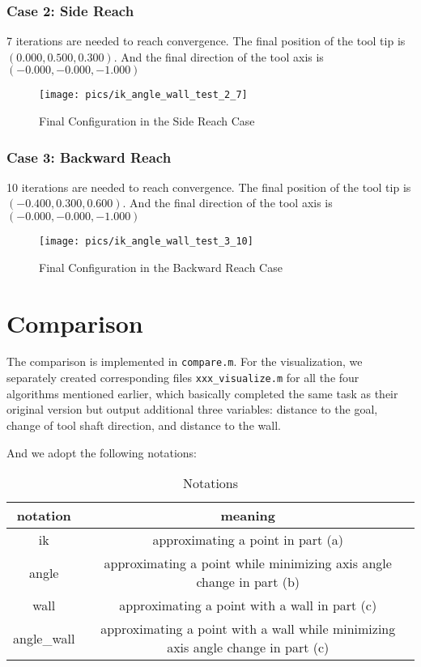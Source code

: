 \documentclass[english,10pt,a4paper]{book}
\begin{document}
		\subsubsection{Case 2: Side Reach}
		7 iterations are needed to reach convergence.
		The final position of the tool tip is \((0.000, 0.500, 0.300)\). And the final direction of the tool axis is \((-0.000, -0.000, -1.000)\)
		\begin{figure}[H]
			\centering
			\texttt{[image: pics/ik\_angle\_wall\_test\_2\_7]}
			\caption{Final Configuration in the Side Reach Case}
		\end{figure}
		\subsubsection{Case 3: Backward Reach}
		10 iterations are needed to reach convergence.
		The final position of the tool tip is \((-0.400, 0.300, 0.600)\). And the final direction of the tool axis is \((-0.000, -0.000, -1.000)\)
		\begin{figure}[H]
			\centering
			\texttt{[image: pics/ik\_angle\_wall\_test\_3\_10]}
			\caption{Final Configuration in the Backward Reach Case}
		\end{figure}
		
		\section{Comparison}
		The comparison is implemented in \texttt{compare.m}. For the visualization, we separately created corresponding files \texttt{xxx\_visualize.m} for all the four algorithms mentioned earlier, which basically completed the same task as their original version but output additional three variables: distance to the goal, change of tool shaft direction, and distance to the wall.
		
		And we adopt the following notations:
		\begin{table}[H]
			\caption{Notations}
			\begin{tabular}{|c|c|}
				\hline
				notation & meaning \\
				\hline
				ik & approximating a point in part (a) \\
				\hline
				angle & approximating a point while minimizing axis angle change in part (b) \\
				\hline
				wall & approximating a point with a wall in part (c) \\
				\hline
				angle\_wall & approximating a point with a wall while minimizing axis angle change in part (c) \\
				\hline
			\end{tabular}
		\end{table}
		
\end{document}
